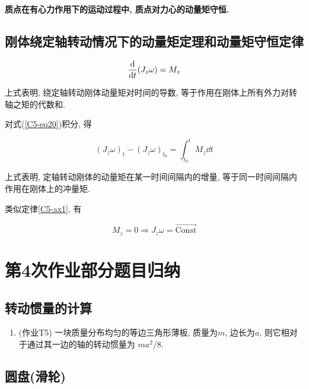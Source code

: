 \textbf{质点在有心力作用下的运动过程中, 质点对力心的动量矩守恒. }

\subsection{刚体绕定轴转动情况下的动量矩定理和动量矩守恒定律}

\begin{theorem}[刚体绕定轴转动情况下的动量矩定理] \label{C5-th4}
	\begin{equation}
		\dv{t}(J_z\omega) = M_z \label{C5-eq20}
	\end{equation}
	
	上式表明, 绕定轴转动刚体动量矩对时间的导数, 等于作用在刚体上所有外力对转轴之矩的代数和. 
	
	对式(\ref{C5-eq20})积分, 得
	
	\begin{equation}
		{(J_z\omega)}_t - {(J_z\omega)}_{t_0} = \int_{t_0}^{t} M_z \dd{t} \label{C5-eq21}
	\end{equation}

    上式表明, 定轴转动刚体的动量矩在某一时间间隔内的增量, 等于同一时间间隔内作用在刚体上的冲量矩. 
    
\end{theorem}

类似定律\ref{C5-ax1}, 有

\begin{equation}
	M_z = 0 \Longrightarrow J_z \omega = \overrightarrow{\text{Const}} \label{C5-eq22}
\end{equation}

\section{第4次作业部分题目归纳} \label{5.5}

\subsection{转动惯量的计算}

\begin{enumerate}
	
	\item (作业T5) 一块质量分布均匀的等边三角形薄板, 质量为$m$, 边长为$a$, 则它相对于通过其一边的轴的转动惯量为 \uline{$ma^2/8$}. 
	
\end{enumerate}

\subsection{圆盘(滑轮)}

